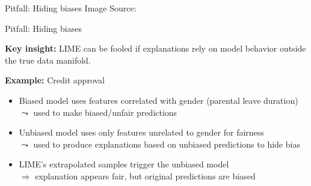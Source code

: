 \documentclass[10pt,compress,t,notes=noshow, xcolor=table]{beamer}
\begin{document}
\begin{frame}{Pitfall: Hiding biases }
	    Image Source: 
\end{frame}



\begin{frame}{Pitfall: Hiding biases }

\textbf{Key insight:} LIME can be fooled if explanations rely on model behavior outside the true data manifold.

\lz
   
\textbf{Example:} Credit approval
  \begin{itemize}
    \item Biased model uses features correlated with gender (parental leave duration)\\
    $\leadsto$ used to make biased/unfair predictions
    \item Unbiased model uses only features unrelated to gender for fairness\\%
    $\leadsto$ used to produce explanations based on unbiased predictions to hide bias
    \item LIME’s extrapolated samples trigger the unbiased model\\
    $\Rightarrow$ explanation appears fair, but original predictions are biased
  \end{itemize}

\end{frame}
\end{document}
